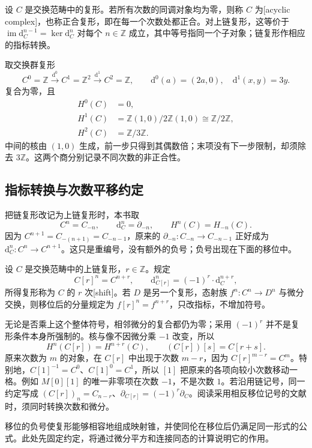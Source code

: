 \begin{definition}\label{b4:def:acyclic-complex}
	设 \(C\) 是交换范畴中的复形。若所有次数的同调对象均为零，则称 \(C\) 为[acyclic complex]，也称正合复形，即在每一个次数处都正合。对上链复形，这等价于 \(\operatorname{im}\mathrm{d}_C^{n-1}=\ker\mathrm{d}_C^n\) 对每个 \(n\in\mathbb Z\) 成立，其中等号指同一个子对象；链复形作相应的指标转换。
\end{definition}

\begin{example}\label{b4:exm:integer-three-complex}
	取交换群复形
	\[
		C^0=\mathbb Z\xrightarrow{\ \mathrm{d}^0\ }C^1=\mathbb Z^2 \xrightarrow{\ \mathrm{d}^1\ }C^2=\mathbb Z, \qquad \mathrm{d}^0(a)=(2a,0),\quad \mathrm{d}^1(x,y)=3y.
	\]
	复合为零，且
	\[
		\begin{aligned}
			H^0(C)&=0,\\
			H^1(C)&=\mathbb Z(1,0)/2\mathbb Z(1,0)\cong\mathbb Z/2\mathbb Z,\\
			H^2(C)&=\mathbb Z/3\mathbb Z.
		\end{aligned}
	\]
	中间的核由 \((1,0)\) 生成，前一步只得到其偶数倍；末项没有下一步限制，却须除去 \(3\mathbb Z\)。这两个商分别记录不同次数的非正合性。
\end{example}

\subsection{指标转换与次数平移约定}
\label{b4:subsec:0501:03}

把链复形改记为上链复形时，本书取
\[
	C^n=C_{-n},\qquad \mathrm{d}_C^n=\partial_{-n},\qquad H^n(C)=H_{-n}(C).
\]
因为 \(C^{n+1}=C_{-(n+1)}=C_{-n-1}\)，原来的 \(\partial_{-n}:C_{-n}\to C_{-n-1}\) 正好成为 \(\mathrm{d}_C^n:C^n\to C^{n+1}\)。这只是重编号，没有额外的负号；负号出现在下面的移位中。

\begin{definition}\label{b4:def:complex-shift}
	设 \(C\) 是交换范畴中的上链复形，\(r\in\mathbb Z\)。规定
	\[
		C[r]^n=C^{n+r},\qquad \mathrm{d}_{C[r]}^n=(-1)^r\cdot\mathrm{d}_C^{n+r},
	\]
	所得复形称为 \(C\) 的 \(r\) 次[shift]。若 \(D\) 是另一个复形，态射族 \(f^n:C^n\to D^n\) 与微分交换，则移位后的分量规定为 \(f[r]^n=f^{n+r}\)，只改指标，不增加符号。
\end{definition}

无论是否乘上这个整体符号，相邻微分的复合都仍为零；采用 \((-1)^r\) 并不是复形条件本身所强制的。核与像不因微分乘 \(-1\) 改变，所以
\[
	H^n(C[r])=H^{n+r}(C),\qquad (C[r])[s]=C[r+s].
\]
原来次数为 \(m\) 的对象，在 \(C[r]\) 中出现于次数 \(m-r\)，因为 \(C[r]^{m-r}=C^m\)。特别地，\(C[1]^{-1}=C^0\)、\(C[1]^0=C^1\)，所以 \([1]\) 把原来的各项向较小次数移动一格。例如 \(M[0][1]\) 的唯一非零项在次数 \(-1\)，不是次数 \(1\)。若沿用链记号，同一约定写成 \((C[r])_n=C_{n-r}\)、\(\partial_{C[r]}=(-1)^r\partial_C\)。阅读采用相反移位记号的文献时，须同时转换次数和微分。

\ProseParagraphBreak
移位的负号使复形能够相容地组成映射锥，并使同伦在移位后仍满足同一形式的公式。此处先固定约定，将通过微分平方和连接同态的计算说明它的作用。
